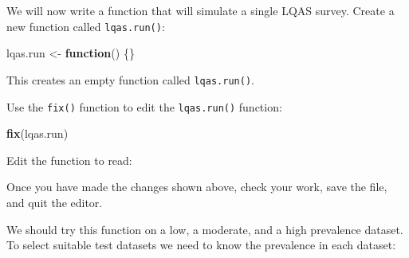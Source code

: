 \documentclass[12pt,a4paper]{book}
\newenvironment{Shaded}{\begin{snugshade}}{\end{snugshade}}
\newcommand{\KeywordTok}[1]{\textcolor[rgb]{0.13,0.29,0.53}{\textbf{#1}}}
\newcommand{\DataTypeTok}[1]{\textcolor[rgb]{0.13,0.29,0.53}{#1}}
\newcommand{\CharTok}[1]{\textcolor[rgb]{0.31,0.60,0.02}{#1}}
\newcommand{\StringTok}[1]{\textcolor[rgb]{0.31,0.60,0.02}{#1}}
\newcommand{\OtherTok}[1]{\textcolor[rgb]{0.56,0.35,0.01}{#1}}
\newcommand{\ControlFlowTok}[1]{\textcolor[rgb]{0.13,0.29,0.53}{\textbf{#1}}}
\newcommand{\OperatorTok}[1]{\textcolor[rgb]{0.81,0.36,0.00}{\textbf{#1}}}
\newcommand{\NormalTok}[1]{#1}
\theoremstyle{definition}
\theoremstyle{definition}
\theoremstyle{definition}
\theoremstyle{remark}
\begin{document}
We will now write a function that will simulate a single LQAS survey.
Create a new function called \texttt{lqas.run()}:

\begin{Shaded}
\begin{Highlighting}[]
\NormalTok{lqas.run <-}\StringTok{ }\ControlFlowTok{function}\NormalTok{() \{\}}
\end{Highlighting}
\end{Shaded}

This creates an empty function called \texttt{lqas.run()}.

Use the \texttt{fix()} function to edit the \texttt{lqas.run()}
function:

\begin{Shaded}
\begin{Highlighting}[]
\KeywordTok{fix}\NormalTok{(lqas.run)}
\end{Highlighting}
\end{Shaded}

Edit the function to read:

Once you have made the changes shown above, check your work, save the
file, and quit the editor.

We should try this function on a low, a moderate, and a high prevalence
dataset. To select suitable test datasets we need to know the prevalence
in each dataset:

\begin{Shaded}
\end{Shaded}
\end{document}
